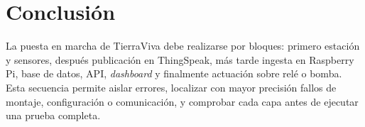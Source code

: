 \section{Conclusión}

La puesta en marcha de TierraViva debe realizarse por bloques: primero estación y sensores, después publicación en ThingSpeak, más tarde ingesta en Raspberry Pi, base de datos, API, \textit{dashboard} y finalmente actuación sobre relé o bomba. Esta secuencia permite aislar errores, localizar con mayor precisión fallos de montaje, configuración o comunicación, y comprobar cada capa antes de ejecutar una prueba completa.
